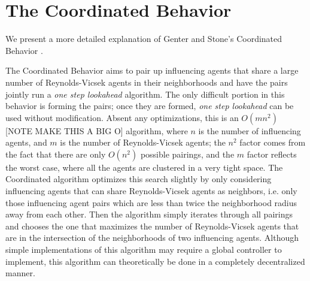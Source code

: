 \chapter{The Coordinated Behavior}
\label{ch:AppendixB}

We present a more detailed explanation of Genter and Stone's Coordinated
Behavior \cite{genter201612steplookahead}.

The Coordinated Behavior aims to pair up influencing agents that share a large
number of Reynolds-Vicsek agents in their neighborhoods and have the pairs
jointly run a \textit{one step lookahead} algorithm.
The only difficult portion in this behavior is forming the pairs; once they are
formed, \textit{one step lookahead} can be used without modification.
Absent any optimizations, this is an $O(mn^2)$ [NOTE MAKE THIS A BIG O]
algorithm, where $n$ is the number of influencing agents, and $m$ is the number
of Reynolds-Vicsek agents; the $n^2$ factor comes from the fact that there are
only $O(n^2)$ possible pairings, and the $m$ factor reflects the worst case,
where all the agents are clustered in a very tight space.
The Coordinated algorithm optimizes this search slightly by only considering
influencing agents that can share Reynolds-Vicsek agents as neighbors, i.e.
only those influencing agent pairs which are less than twice the neighborhood
radius away from each other.
Then the algorithm simply iterates through all pairings and chooses the one
that maximizes the number of Reynolds-Vicsek agents that are in the
intersection of the neighborhoods of two influencing agents.
Although simple implementations of this algorithm may require a global
controller to implement, this algorithm can theoretically be done in a
completely decentralized manner.
